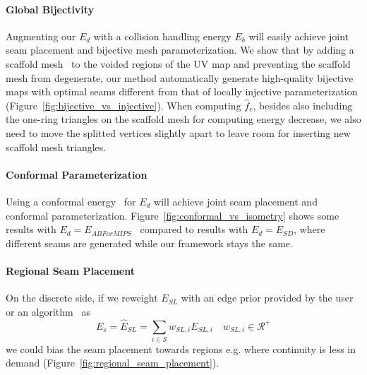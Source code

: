 \paragraph{Global Bijectivity}  \minchen{[DOING]} Augmenting our $E_d$ with a collision handling energy $E_b$ will easily achieve joint seam placement and bijective mesh parameterization. We show that by adding a scaffold mesh~\cite{Jiang2017Simplicial} to the voided regions of the UV map and preventing the scaffold mesh from degenerate, our method automatically generate high-quality bijective maps with optimal seams different from that of locally injective parameterization (Figure~\ref{fig:bijective_vs_injective}). When computing $\hat{f}_e$, besides also including the one-ring triangles on the scaffold mesh for computing energy decrease, we also need to move the splitted vertices slightly apart to leave room for inserting new scaffold mesh triangles.

\paragraph{Conformal Parameterization} \minchen{[TODO]} Using a conformal energy~\cite{Hormann2000MIPS,Sheffer2005ABFPP} for $E_d$ will achieve joint seam placement and conformal parameterization. Figure~\ref{fig:conformal_vs_isometry} shows some results with $E_d = E_{ABForMIPS}$~\cite{} compared to results with $E_d = E_{SD}$, where different seams are generated while our framework stays the same.

\paragraph{Regional Seam Placement} \minchen{[TODO]} On the discrete side, if we reweight $E_{SL}$ with an edge prior provided by the user or an algorithm~\cite{} as
\[ E_s = \hat{E}_{SL} = \sum_{i\in\mathcal{S}} w_{SL,i} E_{SL,i} \quad w_{SL,i} \in \mathcal{R^+} \]
we could bias the seam placement towards regions e.g. where continuity is less in demand (Figure~\ref{fig:regional_seam_placement}).

